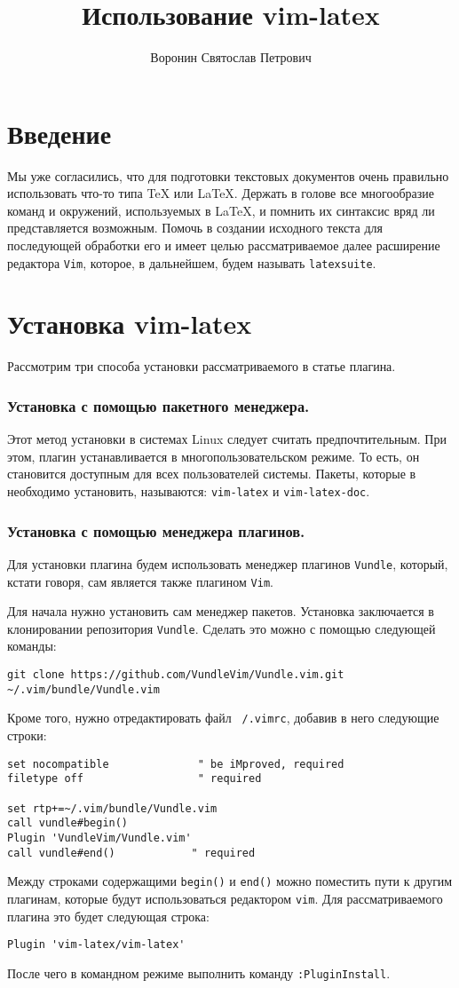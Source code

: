 \documentclass[a4paper]{article}
\author{Воронин Святослав Петрович}
\title{Использование vim-latex}
\begin{document}
\maketitle
\tableofcontents

\part{Введение}
Мы уже согласились, что для подготовки текстовых документов очень правильно
использовать что-то типа \TeX{} или \LaTeX. Держать в голове все многообразие
команд и окружений, используемых в \LaTeX, и помнить их синтаксис вряд ли представляется возможным.
Помочь в создании исходного текста для последующей обработки его 
 и имеет целью рассматриваемое далее расширение редактора \texttt{Vim}, которое, в дальнейшем,
будем называть \texttt{latexsuite}.
\part{Установка vim-latex}\label{part:install}
Рассмотрим три способа установки рассматриваемого в статье плагина.
\section{Установка с помощью пакетного менеджера.}
Этот метод установки в системах Linux следует считать предпочтительным. При этом, плагин устанавливается
в многопользовательском режиме. То есть, он становится доступным для всех пользователей системы.
Пакеты, которые в необходимо установить, называются: \texttt{vim-latex} и \texttt{vim-latex-doc}.
\section{Установка с помощью менеджера плагинов.}
Для установки плагина будем использовать менеджер плагинов \texttt{Vundle}, 
который, кстати говоря, сам является также плагином \texttt{Vim}.

Для начала нужно установить сам менеджер пакетов. Установка заключается в
клонировании репозитория \texttt{Vundle}. Сделать это можно с помощью следующей
команды:
\begin{verbatim}
git clone https://github.com/VundleVim/Vundle.vim.git ~/.vim/bundle/Vundle.vim
\end{verbatim}
Кроме того, нужно отредактировать файл \texttt{~/.vimrc}, добавив в него следующие
строки:
\begin{verbatim}
set nocompatible              " be iMproved, required
filetype off                  " required

set rtp+=~/.vim/bundle/Vundle.vim
call vundle#begin()
Plugin 'VundleVim/Vundle.vim'
call vundle#end()            " required
\end{verbatim}
Между строками содержащими \texttt{begin()} и \texttt{end()} можно поместить 
пути к другим плагинам, которые будут использоваться редактором \texttt{vim}. 
Для рассматриваемого плагина это будет следующая строка:
\begin{verbatim}
Plugin 'vim-latex/vim-latex'
\end{verbatim}
После чего в командном режиме выполнить команду \texttt{:PluginInstall}.
\end{document}
